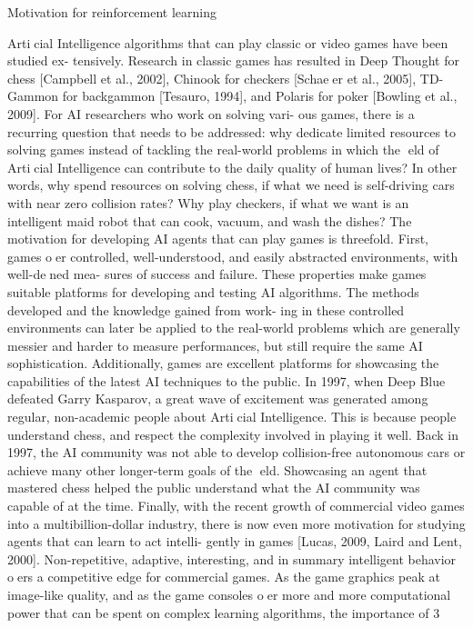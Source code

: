 Motivation for reinforcement learning



Articial Intelligence algorithms that can play classic or video games have been studied ex-
tensively. Research in classic games has resulted in Deep Thought for chess [Campbell et al., 2002],
Chinook for checkers [Schaeer et al., 2005], TD-Gammon for backgammon [Tesauro, 1994],
and Polaris for poker [Bowling et al., 2009]. For AI researchers who work on solving vari-
ous games, there is a recurring question that needs to be addressed: why dedicate limited
resources to solving games instead of tackling the real-world problems in which the eld of
Articial Intelligence can contribute to the daily quality of human lives? In other words,
why spend resources on solving chess, if what we need is self-driving cars with near zero
collision rates? Why play checkers, if what we want is an intelligent maid robot that can
cook, vacuum, and wash the dishes?
The motivation for developing AI agents that can play games is threefold. First, games
oer controlled, well-understood, and easily abstracted environments, with well-dened mea-
sures of success and failure. These properties make games suitable platforms for developing
and testing AI algorithms. The methods developed and the knowledge gained from work-
ing in these controlled environments can later be applied to the real-world problems which
are generally messier and harder to measure performances, but still require the same AI
sophistication.
Additionally, games are excellent platforms for showcasing the capabilities of the latest
AI techniques to the public. In 1997, when Deep Blue defeated Garry Kasparov, a great
wave of excitement was generated among regular, non-academic people about Articial
Intelligence. This is because people understand chess, and respect the complexity involved
in playing it well. Back in 1997, the AI community was not able to develop collision-free
autonomous cars or achieve many other longer-term goals of the eld. Showcasing an agent
that mastered chess helped the public understand what the AI community was capable of
at the time.
Finally, with the recent growth of commercial video games into a multibillion-dollar
industry, there is now even more motivation for studying agents that can learn to act intelli-
gently in games [Lucas, 2009, Laird and Lent, 2000]. Non-repetitive, adaptive, interesting,
and in summary intelligent behavior oers a competitive edge for commercial games. As
the game graphics peak at image-like quality, and as the game consoles oer more and more
computational power that can be spent on complex learning algorithms, the importance of
3


